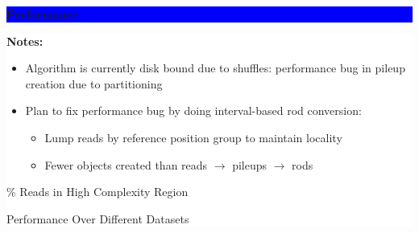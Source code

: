 \documentclass[11pt]{a0poster}
\begin{document}
{\begin{minipage}[t][2045pt][t]{\linewidth}
\begin{minipage}{0.6\linewidth}
\vspace{70pt}
\colorbox{Blue}{
\begin{minipage}[t]{\linewidth}
\vspace{30pt}
\begin{center}
\Huge \bf \color{White} Performance
\end{center}
\vspace{17pt}
\end{minipage}
}
\colorbox{White}{
\begin{minipage}[t][500pt][t]{\linewidth}
\begin{minipage}{0.3\linewidth}
\LARGE
\color{Blue}
\textbf{Notes:}
\begin{itemize}
\item Algorithm is currently disk bound due to shuffles:
performance bug in pileup creation due to partitioning
\item Plan to fix performance bug by doing interval-based rod conversion: 
\Large
\begin{itemize}
\item Lump reads by reference position group to maintain locality
\item Fewer objects created than reads $\to$ pileups $\to$ rods
\end{itemize}
\end{itemize}
\end{minipage}
\begin{minipage}{0.03\linewidth}
\hfill
\pagebreak
\end{minipage}
\begin{minipage}{0.3\linewidth}
\end{minipage}
\begin{minipage}{0.03\linewidth}
\hfill
\pagebreak
\end{minipage}
\begin{minipage}{0.3\linewidth}
\color{Blue}
\begin{center}
\% Reads in High Complexity Region
\end{center}
\color{Blue}
\begin{center}
Performance Over Different Datasets
\end{center}
\end{minipage}
\pagebreak
\end{minipage}
}


\end{minipage}
\end{minipage}}
\end{document}
